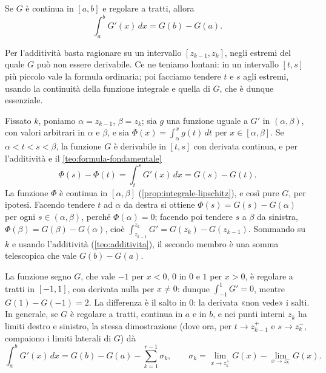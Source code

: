 \begin{teorema}
\label{teo:formula-regolari-tratti}
Se $G$ è continua in $[a,b]$ e regolare a tratti, allora
\begin{equation}\label{eq:formula-regolari-tratti}
  \int_{a}^{b}G'(x)\,dx=G(b)-G(a) .
\end{equation}
\end{teorema}

\begin{schema}
\end{schema}

\begin{strategia}
Per l'additività basta ragionare su un intervallo $[z_{k-1},z_{k}]$, negli estremi del
quale $G$ può non essere derivabile. Ce ne teniamo lontani: in un intervallo $[t,s]$ più
piccolo vale la formula ordinaria; poi facciamo tendere $t$ e $s$ agli estremi, usando
la continuità della funzione integrale e quella di $G$, che è dunque essenziale.
\end{strategia}

\begin{dimostrazione}
Fissato $k$, poniamo $\alpha=z_{k-1}$, $\beta=z_{k}$; sia $g$ una funzione uguale a $G'$
in $(\alpha,\beta)$, con valori arbitrari in $\alpha$ e $\beta$, e sia
$\Phi(x)=\int_{\alpha}^{x}g(t)\,dt$ per $x\in[\alpha,\beta]$. Se $\alpha<t<s<\beta$, la
funzione $G$ è derivabile in $[t,s]$ con derivata continua, e per l'additività e il
\cref{teo:formula-fondamentale}
\[
  \Phi(s)-\Phi(t)=\int_{t}^{s}G'(x)\,dx=G(s)-G(t) .
\]
La funzione $\Phi$ è continua in $[\alpha,\beta]$ (\cref{prop:integrale-lipschitz}), e
così pure $G$, per ipotesi. Facendo tendere $t$ ad $\alpha$ da destra si ottiene
$\Phi(s)=G(s)-G(\alpha)$ per ogni $s\in(\alpha,\beta)$, perché $\Phi(\alpha)=0$; facendo
poi tendere $s$ a $\beta$ da sinistra, $\Phi(\beta)=G(\beta)-G(\alpha)$, cioè
$\int_{z_{k-1}}^{z_{k}}G'=G(z_{k})-G(z_{k-1})$. Sommando su $k$ e usando l'additività
(\cref{teo:additivita}), il secondo membro è una somma telescopica che vale $G(b)-G(a)$.
\end{dimostrazione}

\begin{osservazione}\label{oss:regolari-tratti-salti}
La funzione segno $G$, che vale $-1$ per $x<0$, $0$ in $0$ e $1$ per $x>0$, è regolare a tratti
in $[-1,1]$, con derivata nulla per $x\neq0$: dunque $\int_{-1}^{1}G'=0$, mentre
$G(1)-G(-1)=2$. La differenza è il salto in $0$: la derivata «non vede» i salti. In
generale, se $G$ è regolare a tratti, continua in $a$ e in $b$, e nei punti interni
$z_{k}$ ha limiti destro e sinistro, la stessa dimostrazione (dove ora, per $t\to z_{k-1}^{+}$
e $s\to z_{k}^{-}$, compaiono i limiti laterali di $G$) dà
\[
  \int_{a}^{b}G'(x)\,dx=G(b)-G(a)-\sum_{k=1}^{r-1}\sigma_{k}, \qquad
  \sigma_{k}=\lim_{x\to z_{k}^{+}}G(x)-\lim_{x\to z_{k}^{-}}G(x) .
\]
\end{osservazione}

